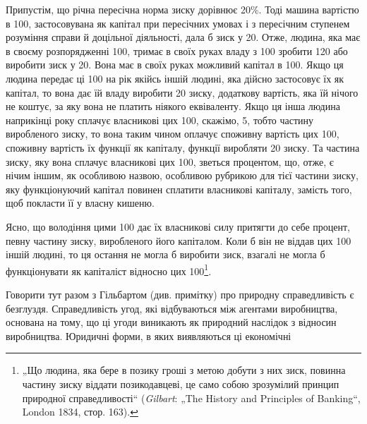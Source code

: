 Припустім, що річна пересічна норма зиску дорівнює 20\%.
Тоді машина вартістю в 100, застосовувана
як капітал при пересічних умовах і з пересічним ступенем розуміння
справи й доцільної діяльності, дала б зиск у 20. Отже, людина, яка має в своєму розпорядженні
100, тримає в своїх руках владу з 100 зробити
120 або виробити зиск у 20.
Вона має в своїх руках можливий капітал в 100. Якщо ця людина передає ці 100
на рік якійсь іншій людині, яка дійсно застосовує їх як капітал,
то вона дає їй владу виробити 20 зиску, додаткову
вартість, яка їй нічого не коштує, за яку вона не платить
ніякого еквіваленту. Якщо ця інша людина наприкінці
року сплачує власникові цих 100, скажімо,
5, тобто частину виробленого зиску, то вона
таким чином оплачує споживну вартість цих 100,
споживну вартість їх функції як капіталу, функції виробляти
20 зиску. Та частина зиску, яку вона
сплачує власникові цих 100, зветься процентом,
що, отже, є нічим іншим, як особливою назвою, особливою
рубрикою для тієї частини зиску, яку функціонуючий капітал
повинен сплатити власникові капіталу, замість того, щоб покласти
її у власну кишеню.

Ясно, що володіння цими 100 дає їх
власникові силу притягти до себе процент, певну частину
зиску, виробленого його капіталом. Коли б він не віддав цих
100 іншій людині, то ця остання не могла б
виробити зиск, взагалі не могла б функціонувати як капіталіст
відносно цих 100\footnote{„Що людина, яка бере в позику гроші з метою добути з них зиск, повинна
частину зиску віддати позикодавцеві, це само собою зрозумілий принцип
природної справедливості“ (\emph{Gilbart}: „The History and Principles of Banking“,
London 1834, стор. 163).}.

Говорити тут разом з Гільбартом (див. примітку) про природну
справедливість є безглуздя. Справедливість угод, які
відбуваються між агентами виробництва, основана на тому, що
ці угоди виникають як природний наслідок з відносин виробництва.
Юридичні форми, в яких виявляються ці економічні
\parbreak{}  %
